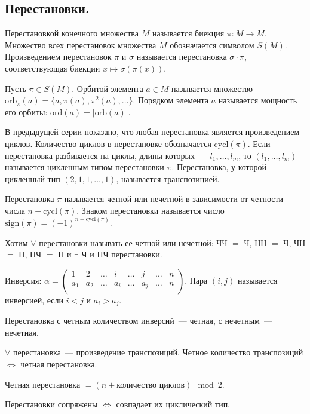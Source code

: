 \documentclass[12pt]{article}
\newcommand{\orb}{\text{orb}}
\newcommand{\ord}{\text{ord}}
\newcommand{\cycl}{\text{cycl}}
\begin{document}
	\subsection{Перестановки.}
	\begin{definition}
		Перестановкой конечного множества $M$ называется биекция $\pi : M \rightarrow M $. Множество всех перестановок множества $M$ обозначается символом $S(M)$. Произведением перестановок $\pi$ и $\sigma$ называется перестановка $\sigma \cdot \pi$, соответствующая биекции $x \mapsto \sigma (\pi (x))$.
	\end{definition}
	\begin{definition}
		Пусть $\pi \in S(M)$. Орбитой элемента $a \in M$ называется множество $\orb_{\pi}(a) = \{ a, \pi(a), \pi^2(a), \dots \}$. Порядком элемента $a$ называется мощность его орбиты: $\ord(a) = |\orb(a)|$.
	\end{definition}
	\begin{definition}
		В предыдущей серии показано, что любая перестановка является произведением циклов. Количество циклов в перестановке обозначается $\cycl(\pi)$. Если перестановка разбивается на циклы, длины которых~--- $l_1, \dots, l_m$, то $(l_1, \dots,l_m)$ называется цикленным типом перестановки $\pi$. Перестановка, у которой цикленный тип $(2, 1, 1, \dots, 1)$, называется транспозицией.
	\end{definition}
	\begin{definition}
		Перестановка $\pi$ называется четной или нечетной в зависимости от четности числа $n + \cycl(\pi)$. Знаком перестановки называется число $\text{sign}(\pi) = (-1)^{n + \cycl(\pi)}$.
	\end{definition}
	\begin{definition}
		Хотим $\forall$ перестановки называть ее четной или нечетной: ЧЧ $=$ Ч, НН $=$ Ч, ЧН $=$ Н, НЧ $=$ Н и $\exists$ Ч и НЧ перестановки.
	\end{definition}
	\begin{definition}
		Инверсия: $\alpha = \begin{pmatrix}
			1 & 2 & \dots & i & \dots & j & \dots & n \\
			a_1 & a_2 & \dots & a_i & \dots & a_j & \dots & n \\
		\end{pmatrix}$. Пара $(i, j)$ называется инверсией, если $i < j$ и $a_i > a_j$.
	\end{definition}
	\begin{definition}
		Перестановка с четным количеством инверсий~--- четная, с нечетным~--- нечетная.
	\end{definition}
	\begin{note}
		$\forall$ перестановка~--- произведение транспозиций. Четное количество транспозиций $\Leftrightarrow$ четная перестановка.
	\end{note}
	\begin{definition}
		Четная перестановка $= (n + \text{количество циклов}) \mod{2}$.
	\end{definition}
	\begin{theorem}
		Перестановки сопряжены $\Leftrightarrow$ совпадает их циклический тип.
	\end{theorem}
\end{document}
